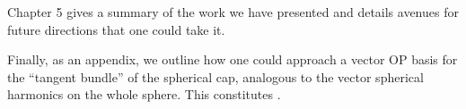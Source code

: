 Chapter 5 gives a summary of the work we have presented and details avenues for future directions that one could take it.

Finally, as an appendix, we outline how one could approach a vector OP basis for the \enquote{tangent bundle} of the spherical cap, analogous to the vector spherical harmonics on the whole sphere. This constitutes .

